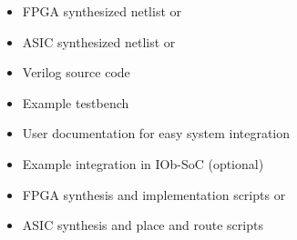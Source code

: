 \begin{itemize}
\item FPGA synthesized netlist or
\item ASIC synthesized netlist or
\item Verilog source code
\item Example testbench
\item User documentation for easy system integration
\item Example integration in IOb-SoC (optional)
\item FPGA synthesis and implementation scripts or
\item ASIC synthesis and place and route scripts
\end{itemize}
